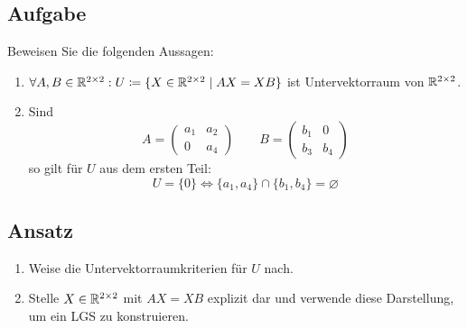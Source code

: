 \subsection{Aufgabe}
Beweisen Sie die folgenden Aussagen:
\begin{enumerate}
	\item \( \forall A, B \in \mathbb{R}^{2 \times 2}: U \coloneqq \{ X \in \mathbb{R}^{2 \times 2} \mid AX = XB \} \) ist Untervektorraum von \( \mathbb{R}^{2 \times 2} \).
	\item Sind
	\begin{equation*}
	  	A = \begin{pmatrix}
	  		a_1 & a_2 \\
	  		0 & a_4
	  	\end{pmatrix} \qquad B = \begin{pmatrix}
	  		b_1 & 0 \\
	  		b_3 & b_4
	  	\end{pmatrix}
	\end{equation*}
	so gilt für \( U \) aus dem ersten Teil:
	\begin{equation*}
		U = \{ 0 \} \Leftrightarrow \{ a_1, a_4 \} \cap \{ b_1, b_4 \} = \varnothing
	\end{equation*}
\end{enumerate}

\subsection{Ansatz}
\begin{enumerate}
	\item Weise die Untervektorraumkriterien für \( U \) nach.
	\item Stelle \( X \in \mathbb{R}^{2 \times 2} \) mit \( AX = XB \) explizit dar und verwende diese Darstellung, um ein LGS zu konstruieren.  
\end{enumerate}

